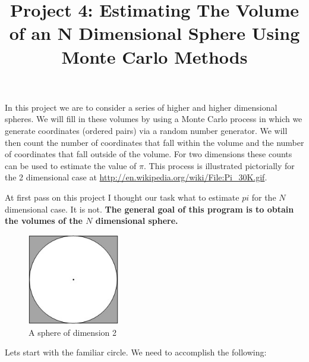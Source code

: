 \documentclass[11pt]{amsart}
\title{Project 4: Estimating The Volume of an N Dimensional Sphere Using Monte Carlo Methods}
\begin{document}
\maketitle

In this project we are to consider a series of higher and higher dimensional spheres.  We will fill in these volumes by using a Monte Carlo process in which we generate coordinates (ordered pairs) via a random number generator.  We will then count the number of coordinates that fall within the volume and the number of coordinates that fall outside of the volume.  For two dimensions these counts can be used to estimate the value of $\pi$.  This process is illustrated pictorially for the 2 dimensional case at \url{http://en.wikipedia.org/wiki/File:Pi_30K.gif}.  \newline 
\vspace{2 mm}

At first pass on this project I thought our task what to estimate $pi$ for the $N$ dimensional case.  It is not.  \textbf {The general goal of this program is to obtain the volumes of the $N$ dimensional sphere.}
\newline

\begin{figure}[ht!]
\centering
\includegraphics[width=40mm]{circle.jpg}
\caption{A sphere of dimension 2}
\label{overflow}
\end{figure}

Lets start with the familiar circle.  We need to accomplish the following:
\end{document}
